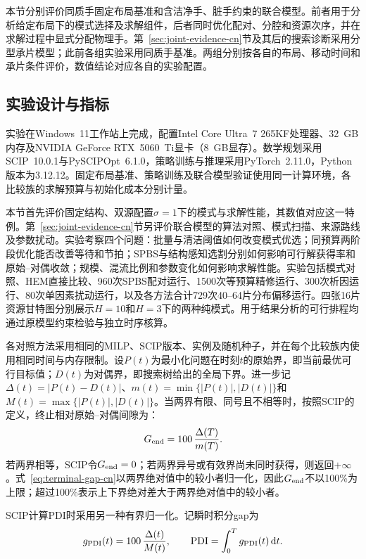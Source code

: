 \documentclass[final,5p,times,twocolumn]{elsarticle}
\newcommand{\pdi}{\mathrm{PDI}}
\begin{document}
本节分别评价同质手固定布局基准和含洁净手、脏手约束的联合模型。前者用于分析给定布局下的模式选择及求解组件，后者同时优化配对、分腔和资源次序，并在求解过程中显式分配物理手。第~\ref{sec:joint-evidence-cn}节及其后的搜索诊断采用分型承片模型；此前各组实验采用同质手基准。两组分别按各自的布局、移动时间和承片条件评价，数值结论对应各自的实验配置。

\subsection{实验设计与指标}

实验在Windows~11工作站上完成，配置Intel Core Ultra~7 265KF处理器、32~GB内存及NVIDIA GeForce RTX~5060~Ti显卡（8~GB显存）。数学规划采用SCIP~10.0.1与PySCIPOpt~6.1.0，策略训练与推理采用PyTorch~2.11.0，Python版本为3.12.12。固定布局基准、策略训练及联合模型验证使用同一计算环境，各比较族的求解预算与初始化成本分别计量。

本节首先评价固定结构、双源配置$\sigma=1$下的模式与求解性能，其数值对应这一特例。第~\ref{sec:joint-evidence-cn}节另评价联合模型的算法对照、模式扫描、来源路线及参数扰动。实验考察四个问题：批量与清洁阈值如何改变模式优选；同预算两阶段优化能否改善等待和节拍；SPBS与结构感知选割分别如何影响可行解获得率和原始--对偶收敛；规模、混流比例和参数变化如何影响求解性能。实验包括模式对照、HEM直接比较、960次SPBS配对运行、1500次等预算精修运行、300次析因运行、80次单因素扰动运行，以及各方法合计729次40--64片分布偏移运行。四张16片资源甘特图分别展示$H=10$和$H=3$下的两种纯模式。用于结果分析的可行排程均通过原模型约束检验与独立时序核算。

各对照方法采用相同的MILP、SCIP版本、实例及随机种子，并在每个比较族内使用相同时间与内存限制。设$P(t)$为最小化问题在时刻$t$的原始界，即当前最优可行目标值；$D(t)$为对偶界，即搜索树给出的全局下界。进一步记$\Delta(t)=|P(t)-D(t)|$、$m(t)=\min\{|P(t)|,|D(t)|\}$和$M(t)=\max\{|P(t)|,|D(t)|\}$。当两界有限、同号且不相等时，按照SCIP的定义，终止相对原始--对偶间隙为：
\begin{equation}
G_{\rm end}=100\,\frac{\Delta(T)}{m(T)}.
\label{eq:terminal-gap-cn}
\end{equation}
若两界相等，SCIP令$G_{\rm end}=0$；若两界异号或有效界尚未同时获得，则返回$+\infty$。式~\eqref{eq:terminal-gap-cn}以两界绝对值中的较小者归一化，因此$G_{\rm end}$不以100\%为上限；超过100\%表示上下界绝对差大于两界绝对值中的较小者。

SCIP计算PDI时采用另一种有界归一化。记瞬时积分gap为
\begin{equation}
g_{\rm PDI}(t)=100\,\frac{\Delta(t)}{M(t)},\qquad
\pdi=\int_0^T g_{\rm PDI}(t)\,\mathrm dt.
\label{eq:pdi-gap-cn}
\end{equation}
\end{document}
